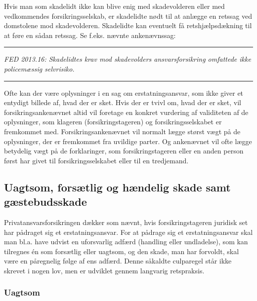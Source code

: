\documentclass[]{book}
\begin{document}
Hvis man som skadelidt ikke kan blive enig med skadevolderen eller med vedkommendes forsikringsselskab, er skadelidte nødt til at anlægge en retssag ved domstolene mod skadevolderen. Skadelidte kan eventuelt få retshjælpsdækning til at føre en sådan retssag. Se f.eks. nævnte ankenævnssag:

\begin{center}\rule{0.5\linewidth}{\linethickness}\end{center}

\emph{FED 2013.16: Skadelidtes krav mod skadevolders ansvarsforsikring omfattede ikke policemæssig selvrisiko.}

\begin{center}\rule{0.5\linewidth}{\linethickness}\end{center}

Ofte kan der være oplysninger i en sag om erstatningsansvar, som ikke giver et entydigt billede af, hvad der er sket. Hvis der er tvivl om, hvad der er sket, vil forsikringsankenævnet altid vil foretage en konkret vurdering af validiteten af de oplysninger, som klageren (forsikringstageren) og forsikringsselskabet er fremkommet med. Forsikringsankenævnet vil normalt lægge størst vægt på de oplysninger, der er fremkommet fra uvildige parter. Og ankenævnet vil ofte lægge betydelig vægt på de forklaringer, som forsikringstageren eller en anden person først har givet til forsikringsselskabet eller til en tredjemand.

\hypertarget{uagtsom-forstlig-og-hndelig-skade-samt-gstebudsskade}{%
\subsection{Uagtsom, forsætlig og hændelig skade samt gæstebudsskade}\label{uagtsom-forstlig-og-hndelig-skade-samt-gstebudsskade}}

Privatansvarsforsikringen dækker som nævnt, hvis forsikringstageren juridisk set har pådraget sig et erstatningsansvar. For at pådrage sig et erstatningsansvar skal man bl.a. have udvist en uforsvarlig adfærd (handling eller undladelse), som kan tilregnes én som forsætlig eller uagtsom, og den skade, man har forvoldt, skal være en påregnelig følge af ens adfærd. Denne såkaldte culparegel står ikke skrevet i nogen lov, men er udviklet gennem langvarig retspraksis.

\hypertarget{uagtsom}{%
\subsubsection{Uagtsom}\label{uagtsom}}
\end{document}
